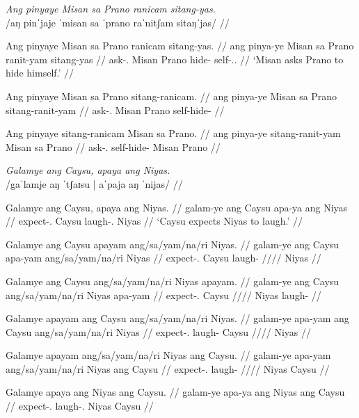 \documentclass[12pt,a4paper]{scrartcl}
\newcommand{\TsgM}{{\Tsg}.{\M}}
\newcommand{\TsgF}{{\Tsg}.{\F}}
\begin{document}
\pex
\a\begingl
\glpreamble \textit{Ang pinyaye Misan sa Prano ranicam sitang-yas.} \\
	/aŋ pinˈjaje ˈmisan sa ˈprano raˈnitʃam sitaŋˈjas/ //

\gla Ang pinyaye Misan sa Prano ranicam sitang-yas. //
\glb ang pinya-ye Misan sa Prano ranit-yam sitang-yas //
\glc \AgtT{} ask-\TsgF{} Misan \Parg{} Prano hide-\Ptcp{} self-\TsgM{}.\Parg{} //
\glft `Misan asks Prano to hide himself.' //
\endgl

\a\begingl
\gla Ang pinyaye Misan sa Prano sitang-ranicam. //
\glb ang pinya-ye Misan sa Prano sitang-ranit-yam //
\glc \AgtT{} ask-\TsgF{} Misan \Parg{} Prano self-hide-\Ptcp{} //
\endgl

\a\begingl
\gla Ang pinyaye sitang-ranicam Misan sa Prano. //
\glb ang pinya-ye sitang-ranit-yam Misan sa Prano //
\glc \AgtT{} ask-\TsgF{} self-hide-\Ptcp{} Misan \Parg{} Prano //
\endgl
\xe

\pex
\a\begingl
\glpreamble \textit{Galamye ang Caysu, apaya ang Niyas.} \\
	/gaˈlamje aŋ ˈtʃaɪsu | aˈpaja aŋ ˈnijas/ //

\gla Galamye ang Caysu, apaya ang Niyas. //
\glb galam-ye ang Caysu apa-ya ang Niyas //
\glc expect-\TsgF{} \Aarg{} Caysu laugh-\TsgM{} \Aarg{} Niyas //
\glft `Caysu expects Niyas to laugh.' //
\endgl

\a\ljudge*\begingl
\gla Galamye ang Caysu apayam ang/sa/yam/na/ri Niyas. //
\glb galam-ye ang Caysu apa-yam ang/sa/yam/na/ri Niyas //
\glc expect-\TsgF{} \Aarg{} Caysu laugh-\Ptcp{} \Aarg{}/\Parg{}/\Dat{}/\Gen{}/\Ins{} Niyas //
\endgl

\a\ljudge*\begingl
\gla Galamye ang Caysu ang/sa/yam/na/ri Niyas apayam. //
\glb galam-ye ang Caysu ang/sa/yam/na/ri Niyas apa-yam //
\glc expect-\TsgF{} \Aarg{} Caysu \Aarg{}/\Parg{}/\Dat{}/\Gen{}/\Ins{} Niyas laugh-\Ptcp{} //
\endgl

\a\ljudge*\begingl
\gla Galamye apayam ang Caysu ang/sa/yam/na/ri Niyas. //
\glb galam-ye apa-yam ang Caysu ang/sa/yam/na/ri Niyas //
\glc expect-\TsgF{} laugh-\Ptcp{} \Aarg{} Caysu \Aarg{}/\Parg{}/\Dat{}/\Gen{}/\Ins{} Niyas //
\endgl

\a\ljudge*\begingl
\gla Galamye apayam ang/sa/yam/na/ri Niyas ang Caysu. //
\glb galam-ye apa-yam ang/sa/yam/na/ri Niyas ang Caysu //
\glc expect-\TsgF{} laugh-\Ptcp{} \Aarg{}/\Parg{}/\Dat{}/\Gen{}/\Ins{} Niyas \Aarg{} Caysu //
\endgl

\a\ljudge*\begingl
\gla Galamye apaya ang Niyas ang Caysu. //
\glb galam-ye apa-ya ang Niyas ang Caysu //
\glc expect-\TsgF{} laugh-\TsgM{} \Aarg{} Niyas \Aarg{} Caysu //
\endgl
\end{document}
